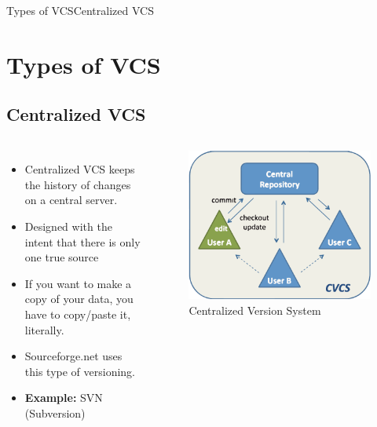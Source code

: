 \documentclass{beamer}
\begin{document}
\begin{frame}{Types of VCS}{Centralized VCS}
\section{Types of VCS}
\subsection{Centralized VCS}
  \begin{columns}
\begin{itemize}
  \item {
    Centralized VCS keeps the history of changes on a central server.
  }
  \item {
    Designed with the intent that there is only one true source  
  }
  \item {
    If you want to make a copy of your data, you have to copy/paste it, literally.  
  }
  \item{
	Sourceforge.net uses this type of versioning.  
  }
  \item{
      \textbf{Example:} SVN (Subversion)
  }  
  \end{itemize}
\begin{figure}
	 \includegraphics[width=.9\textwidth]{images/cvcs}
	 \caption{Centralized Version System \cite{website}}
 \end{figure}
\end{columns}
\end{frame}	
\end{document}
